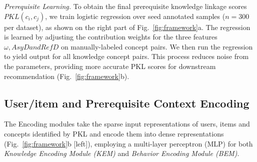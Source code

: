 

\textit{Prerequisite Learning.}
To obtain the final prerequisite knowledge linkage scores $PKL(c_i,c_j)$, we train logistic regression over seed annotated samples ($n = 300$ per dataset), as shown on the right part of Fig.~\ref{fig:framework}a. The regression is learned by adjusting the contribution weights for the three features $\omega, AsyD and RefD$ on manually-labeled concept pairs.  We then run the regression to yield output for all knowledge concept pairs. This process reduces noise from the parameters, providing more accurate PKL scores for downstream recommendation (Fig.~\ref{fig:framework}b).

\subsection{User/item and Prerequisite Context Encoding}
\label{sec:module2}

The Encoding modules take the sparse input representations of users, items and concepts identified by PKL and encode them into dense representations
(Fig.~\ref{fig:framework}b [left]), employing a multi-layer perceptron (MLP) for both \textit{Knowledge Encoding Module (KEM)} and \textit{Behavior Encoding Module (BEM)}.

